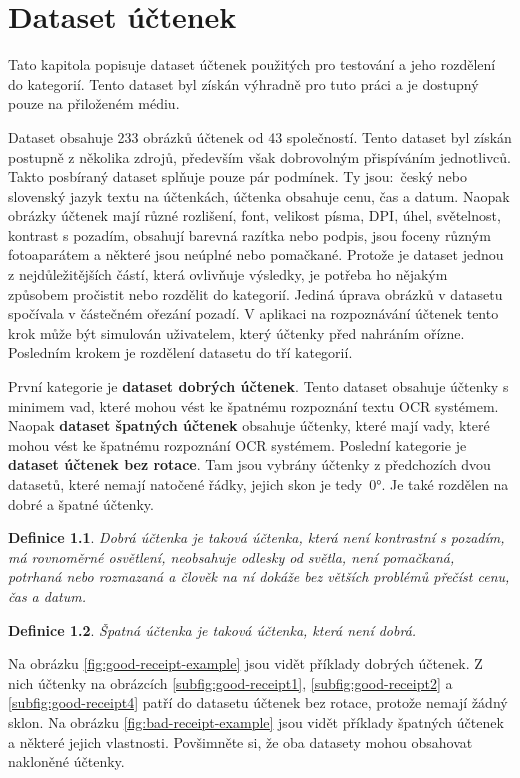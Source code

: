 \documentclass[thesis=B,czech]{FITthesis}[2019/12/23]
\newtheorem{defn}{Definice}[section]
\begin{document}
\chapter{Dataset účtenek}
\label{chapter:dataset-uctenek}
Tato kapitola popisuje dataset účtenek použitých pro testování a jeho rozdělení do kategorií. Tento dataset byl získán výhradně pro tuto práci a je dostupný pouze na přiloženém médiu.

Dataset obsahuje 233 obrázků účtenek od 43 společností. Tento dataset byl získán postupně z několika zdrojů, především však dobrovolným přispíváním jednotlivců. Takto posbíraný dataset splňuje pouze pár podmínek. Ty jsou:~český nebo slovenský jazyk textu na účtenkách, účtenka obsahuje cenu, čas a datum. Naopak obrázky účtenek mají různé rozlišení, font, velikost písma, DPI, úhel, světelnost, kontrast s pozadím, obsahují barevná razítka nebo podpis, jsou foceny různým fotoaparátem a některé jsou neúplné nebo pomačkané. Protože je dataset jednou z nejdůležitějších částí, která ovlivňuje výsledky, je potřeba ho nějakým způsobem pročistit nebo rozdělit do kategorií. Jediná úprava obrázků v datasetu spočívala v částečném ořezání pozadí. V aplikaci na rozpoznávání účtenek tento krok může být simulován uživatelem, který účtenky před nahráním ořízne. Posledním krokem je rozdělení datasetu do tří kategorií.

První kategorie je \textbf{dataset dobrých účtenek}. Tento dataset obsahuje účtenky s minimem vad, které mohou vést ke špatnému rozpoznání textu OCR systémem. Naopak \textbf{dataset špatných účtenek} obsahuje účtenky, které mají vady, které mohou vést ke špatnému rozpoznání OCR systémem. Poslední kategorie je \textbf{dataset účtenek bez rotace}. Tam jsou vybrány účtenky z předchozích dvou datasetů, které nemají natočené řádky, jejich skon je tedy~0°. Je také rozdělen na dobré a špatné účtenky.

\begin{defn}Dobrá účtenka je taková účtenka, která není kontrastní s pozadím, má rovnoměrné osvětlení, neobsahuje odlesky od světla, není pomačkaná, potrhaná nebo rozmazaná a člověk na ní dokáže bez větších problémů přečíst cenu, čas a datum.\end{defn}

\begin{defn}Špatná účtenka je taková účtenka, která není dobrá.\end{defn}

Na obrázku \ref{fig:good-receipt-example} jsou vidět příklady dobrých účtenek. Z nich účtenky na obrázcích  \ref{subfig:good-receipt1}, \ref{subfig:good-receipt2} a \ref{subfig:good-receipt4} patří do datasetu účtenek bez rotace, protože nemají žádný sklon. Na obrázku \ref{fig:bad-receipt-example} jsou vidět příklady špatných účtenek a některé jejich vlastnosti. Povšimněte si, že oba datasety mohou obsahovat nakloněné účtenky.
\end{document}
